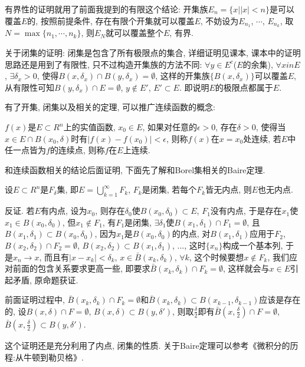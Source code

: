 \documentclass[12pt,a4paper,openany]{book}
\begin{document}
有界性的证明就用了前面我提到的有限这个结论: 开集族$E_n = \{ x | |x| < n\}$是可以覆盖$E$的, 按照前提条件, 存在有限个开集就可以覆盖$E$, 不妨设为$E_{n_1}$, $\cdots$, $E_{n_k}$, 取$N = \max\{n_1, \cdots, n_k\}$, 则$E_N$就可以覆盖整个$E$, 有界.

关于闭集的证明: 闭集是包含了所有极限点的集合, 详细证明见课本, 课本中的证明思路还是用到了有限性, 只不过构造开集族的方法不同: $\forall y \in E^c$($E$的余集), $\forall x in E$, $\exists \delta_x > 0$, 使得$B(x, \delta_x) \cap B(y, \delta_x) = \emptyset$, 这样的开集族$\{B(x, \delta_x)\}$可以覆盖$E$, 从有限性可知$B(y, \delta_x) \cap E = \emptyset$, $y \notin E'$, $E' \subset E$. 即说明$E$的极限点都属于$E$.

有了开集, 闭集以及相关的定理, 可以推广连续函数的概念:

$f(x)$是$E \subset R^n$上的实值函数, $x_0 \in E$, 如果对任意的$\epsilon > 0$, 存在$\delta > 0$, 使得当$x \in E \cap B(x_0, \delta)$时有$|f(x) - f(x_0)| < \epsilon$, 则称$f(x)$在$x = x_0$处连续, 若$E$中任一点皆为$f$的连续点, 则称$f$在$E$上连续.

和连续函数相关的结论后面证明, 下面先了解和Borel集相关的Baire定理.

设$E \subset R^n$是$F_{\delta}$集, 即$E = \bigcup\limits_{k=1}^{\infty}{F_k}$, $F_k$是闭集, 若每个$F_k$皆无内点, 则$E$也无内点.

反证. 若$E$有内点, 设为$x_0$, 则存在$\delta_0$使$B(x_0, \delta_0) \subset E$, $F_1$没有内点, 于是存在$x_1$使$x_1 \in B(x_0, \delta_0)$, 但$x_1 \notin F_1$, 有$F_1$是闭集, $\exists \delta_1$使$B(x_1, \delta_1) \cap F_1 = \emptyset$, 且$B(x_1, \delta_1) \subset B(x_0, \delta_0)$, 因为$x_1$是$B(x_0, \delta_0)$的内点, 对$B(x_1, \delta_1)$应用于$F_2$, $B(x_2,\delta_2) \cap F_2 = \emptyset$, $B(x_2, \delta_2) \subset B(x_1, \delta_1)$, ..., 这时$\{x_n\}$构成一个基本列, 于是$x_n \rightarrow x$, 而且有$|x - x_k| < \delta_k$, $x \in \bar{B}(x_k, \delta_k)$, $\forall k$, 这个时候要想$x \notin F_k$, 我们应对前面的包含关系要求更高一些, 即要求$\bar{B}(x_k, \delta_k) \cap F_k = \emptyset$, 这样就会与$x \in E$引起矛盾, 原命题获证.

前面证明过程中, $\bar{B}(x_k, \delta_k) \cap F_k = \emptyset$和$\bar{B}(x_k, \delta_k) \subset B(x_{k-1}, \delta_{k-1})$应该是存在的, 设$B(x, \delta) \cap F = \emptyset$, $B(x, \delta) \subset B(y, \delta')$, 则取$\frac{\delta}{2}$即有$\bar{B}(x, \frac{\delta}{2}) \cap F = \emptyset$, $\bar{B}(x, \frac{\delta}{2}) \subset B(y, \delta')$.

这个证明还是充分利用了内点, 闭集的性质. 关于Baire定理可以参考《微积分的历程:从牛顿到勒贝格》.
\end{document}

